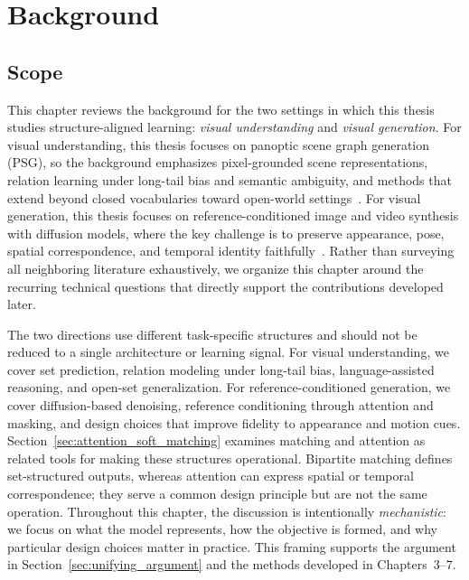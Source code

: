 
\chapter{Background}

\section{Scope}
This chapter reviews the background for the two settings in which this thesis studies structure-aligned learning: \emph{visual understanding} and \emph{visual generation}. For visual understanding, this thesis focuses on panoptic scene graph generation (PSG), so the background emphasizes pixel-grounded scene representations, relation learning under long-tail bias and semantic ambiguity, and methods that extend beyond closed vocabularies toward open-world settings~\citep{zhu2022scene, cheng2022visual, wu2024towards}. For visual generation, this thesis focuses on reference-conditioned image and video synthesis with diffusion models, where the key challenge is to preserve appearance, pose, spatial correspondence, and temporal identity faithfully~\citep{ho2020denoising, rombach2022high}. Rather than surveying all neighboring literature exhaustively, we organize this chapter around the recurring technical questions that directly support the contributions developed later.

The two directions use different task-specific structures and should not be reduced to a single architecture or learning signal. For visual understanding, we cover set prediction, relation modeling under long-tail bias, language-assisted reasoning, and open-set generalization. For reference-conditioned generation, we cover diffusion-based denoising, reference conditioning through attention and masking, and design choices that improve fidelity to appearance and motion cues. Section~\ref{sec:attention_soft_matching} examines matching and attention as related tools for making these structures operational. Bipartite matching defines set-structured outputs, whereas attention can express spatial or temporal correspondence; they serve a common design principle but are not the same operation. Throughout this chapter, the discussion is intentionally \emph{mechanistic}: we focus on what the model represents, how the objective is formed, and why particular design choices matter in practice. This framing supports the argument in Section~\ref{sec:unifying_argument} and the methods developed in Chapters~3--7.

